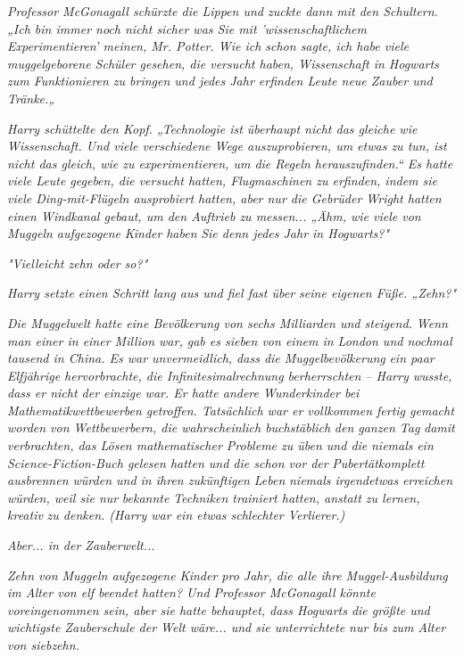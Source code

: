 {\emph{Professor McGonagall schürzte die Lippen und zuckte dann mit den Schultern. „Ich bin immer noch nicht sicher was Sie mit 'wissenschaftlichem Experimentieren' meinen, Mr. Potter. Wie ich schon sagte, ich habe viele muggelgeborene Schüler gesehen, die versucht haben, Wissenschaft in Hogwarts zum Funktionieren zu bringen und jedes Jahr erfinden Leute neue Zauber und Tränke.„}

\emph{Harry schüttelte den Kopf. „Technologie ist überhaupt nicht das gleiche wie Wissenschaft. Und viele verschiedene Wege auszuprobieren, um etwas zu tun, ist nicht das gleich, wie zu experimentieren, um die Regeln herauszufinden.“ Es hatte viele Leute gegeben, die versucht hatten, Flugmaschinen zu erfinden, indem sie viele Ding-mit-Flügeln ausprobiert hatten, aber nur die Gebrüder Wright hatten einen Windkanal gebaut, um den Auftrieb zu messen... „Ähm, wie viele von Muggeln aufgezogene} \emph{Kinder} \emph{\emph{haben}} \emph{Sie denn jedes Jahr in Hogwarts?"}

\emph{"Vielleicht zehn oder so?"}

\emph{Harry setzte einen Schritt lang aus und fiel fast über seine eigenen Füße. „\emph{Zehn?}"}

\emph{Die Muggelwelt hatte eine Bevölkerung von sechs Milliarden und steigend. Wenn man einer in einer Million war, gab es sieben von einem in London und nochmal tausend in China. Es war unvermeidlich, dass die Muggelbevölkerung} \emph{\emph{ein paar}} \emph{Elfjährige hervorbrachte, die Infinitesimalrechnung berherrschten -- Harry wusste, dass er nicht der einzige war. Er hatte andere Wunderkinder bei Mathematikwettbewerben getroffen. Tatsächlich war er vollkommen fertig gemacht worden von Wettbewerbern, die wahrscheinlich buchstäblich} \emph{\emph{den ganzen Tag}} \emph{damit verbrachten, das Lösen mathematischer Probleme zu üben und die} \emph{\emph{niemals}} \emph{ein Science-Fiction-Buch gelesen hatten und die schon vor der} \emph{\emph{Pubertät}\emph{komplett}} \emph{ausbrennen würden und in ihren zukünftigen Leben} \emph{\emph{niemals irgendetwas}} \emph{erreichen würden, weil sie nur} \emph{\emph{bekannte}} \emph{Techniken trainiert hatten, anstatt zu lernen,} \emph{\emph{kreativ}} \emph{zu denken. (Harry war ein etwas schlechter Verlierer.)}

\emph{Aber... in der Zauberwelt...}

\emph{Zehn von Muggeln aufgezogene Kinder pro Jahr, die alle ihre Muggel-Ausbildung im Alter von elf beendet hatten? Und Professor McGonagall könnte voreingenommen sein, aber sie hatte behauptet, dass Hogwarts die größte und wichtigste Zauberschule der Welt wäre... und sie unterrichtete nur bis zum Alter von siebzehn.}

}

